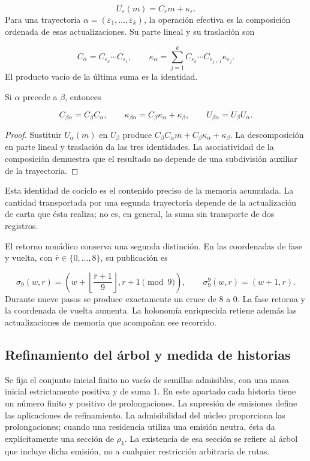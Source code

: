 \[
U_\varepsilon(m)=C_\varepsilon m+\kappa_\varepsilon.
\]
Para una trayectoria \(\alpha=(\varepsilon_1,\ldots,\varepsilon_k)\), la operación efectiva es la composición ordenada de esas actualizaciones. Su parte lineal y su traslación son

\[
C_\alpha=C_{\varepsilon_k}\cdots C_{\varepsilon_1},
\qquad
\kappa_\alpha=
\sum_{j=1}^{k}C_{\varepsilon_k}\cdots
C_{\varepsilon_{j+1}}\kappa_{\varepsilon_j}.
\]
El producto vacío de la última suma es la identidad.

\begin{proposition}
\label{iv:cont:concatenacion}
Si \(\alpha\) precede a \(\beta\), entonces

\[
C_{\beta\alpha}=C_\beta C_\alpha,
\qquad
\kappa_{\beta\alpha}=C_\beta\kappa_\alpha+\kappa_\beta,
\qquad
U_{\beta\alpha}=U_\beta U_\alpha.
\]
\end{proposition}
\begin{proof}
Sustituir \(U_\alpha(m)\) en \(U_\beta\) produce \(C_\beta C_\alpha m+C_\beta\kappa_\alpha+\kappa_\beta\). La descomposición en parte lineal y traslación da las tres identidades. La asociatividad de la composición demuestra que el resultado no depende de una subdivisión auxiliar de la trayectoria.
\end{proof}

Esta identidad de cociclo es el contenido preciso de la memoria acumulada. La cantidad transportada por una segunda trayectoria depende de la actualización de carta que ésta realiza; no es, en general, la suma sin transporte de dos registros.

El retorno nonádico conserva una segunda distinción. En las coordenadas de fase y vuelta, con \(\bar r\in\{0,\ldots,8\}\), su publicación es

\[
\sigma_9(w,r)=
\left(w+\left\lfloor\frac{\bar r+1}{9}\right\rfloor,
r+1\pmod9\right),
\qquad
\sigma_9^9(w,r)=(w+1,r).
\]
Durante nueve pasos se produce exactamente un cruce de \(8\) a \(0\). La fase retorna y la coordenada de vuelta aumenta. La holonomía enriquecida retiene además las actualizaciones de memoria que acompañan ese recorrido.

\subsection{Refinamiento del árbol y medida de historias}
\label{iv:cont:medida}
Se fija el conjunto inicial finito no vacío de semillas admisibles, con una masa inicial estrictamente positiva y de suma \(1\). En este apartado cada historia tiene un número finito y positivo de prolongaciones. La supresión de emisiones define las aplicaciones de refinamiento. La admisibilidad del núcleo proporciona las prolongaciones; cuando una residencia utiliza una emisión neutra, ésta da explícitamente una sección de \(\rho_k\). La existencia de esa sección se refiere al árbol que incluye dicha emisión, no a cualquier restricción arbitraria de rutas.


